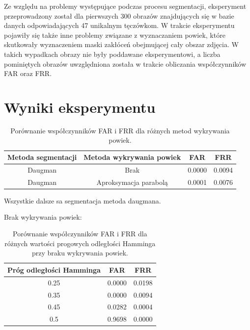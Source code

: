 Ze względu na problemy występujące podczas procesu segmentacji, eksperyment przeprowadzony został dla pierwszych
300 obrazów znajdujących się w bazie danych odpowiadających 47 unikalnym tęczówkom. W trakcie eksperymentu
pojawiły się także inne problemy związane z wyznaczaniem powiek, które skutkowały wyznaczeniem maski zakłóceń
obejmującej cały obszar zdjęcia. W takich wypadkach obrazy nie były poddawane eksperymentowi, a liczba pominiętych
obrazów uwzględniona została w trakcie obliczania współczynników FAR oraz FRR.

\section{Wyniki eksperymentu}



\begin{table}[ht]
  \centering
  \begin{tabular}{c|c|c|c}
    \rowcolor{gray!20}
    Metoda segmentacji & Metoda wykrywania powiek & FAR & FRR \\
    \hline\hline
    Daugman & Brak & 0.0000 & 0.0094 \\
    \hline
    Daugman & Aproksymacja parabolą & 0.0001 & 0.0076 \\
  \end{tabular}
  \caption{Porównanie współczynników FAR i FRR dla różnych metod wykrywania powiek.}
\end{table}

Wszystkie dalsze sa segmentacja metoda daugmana.

Brak wykrywania powiek:

\begin{table}[ht]
  \centering
  \begin{tabular}{c|c|c}
    \rowcolor{gray!20}
    Próg odległości Hamminga & FAR & FRR \\
    \hline\hline
    0.25 & 0.0000 & 0.0198 \\
    \hline
    0.35 & 0.0000 & 0.0094 \\
    \hline
    0.45 & 0.0282 & 0.0004 \\
    \hline
    0.5 & 0.9698 & 0.0000 \\
  \end{tabular}
  \caption{Porównanie współczynników FAR i FRR dla różnych wartości progowych odległości Hamminga
  przy braku wykrywania powiek.}
\end{table}

